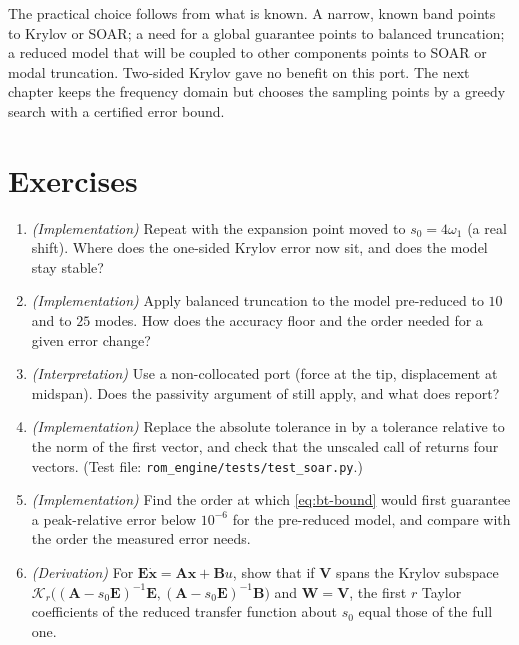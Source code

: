 The practical choice follows from what is known. A narrow, known band points to Krylov or SOAR; a need for a global guarantee points to balanced truncation; a reduced model that will be coupled to other components points to SOAR or modal truncation. Two-sided Krylov gave no benefit on this port. The next chapter keeps the frequency domain but chooses the sampling points by a greedy search with a certified error bound.

\section*{Exercises}\label{sec:bt-exercises}
\begin{enumerate}
\item \emph{(Implementation)} Repeat  with the expansion point moved to $s_0=4\omega_1$ (a real shift). Where does the one-sided Krylov error now sit, and does the model stay stable?
\item \emph{(Implementation)} Apply balanced truncation to the model pre-reduced to $10$ and to $25$ modes. How does the accuracy floor and the order needed for a given error change?
\item \emph{(Interpretation)} Use a non-collocated port (force at the tip, displacement at midspan). Does the passivity argument of  still apply, and what does  report?
\item \emph{(Implementation)} Replace the absolute tolerance in  by a tolerance relative to the norm of the first vector, and check that the unscaled call of  returns four vectors. (Test file: \texttt{rom\_engine/tests/test\_soar.py}.)
\item \emph{(Implementation)} Find the order at which \eqref{eq:bt-bound} would first guarantee a peak-relative error below $10^{-6}$ for the pre-reduced model, and compare with the order the measured error needs.
\item \emph{(Derivation)} For $\bm E\dot{\bm x}=\bm A\bm x+\bm B u$, show that if $\bm V$ spans the Krylov subspace $\mathcal K_r\big((\bm A-s_0\bm E)^{-1}\bm E,(\bm A-s_0\bm E)^{-1}\bm B\big)$ and $\bm W=\bm V$, the first $r$ Taylor coefficients of the reduced transfer function about $s_0$ equal those of the full one.
\end{enumerate}

\chapterrefs
